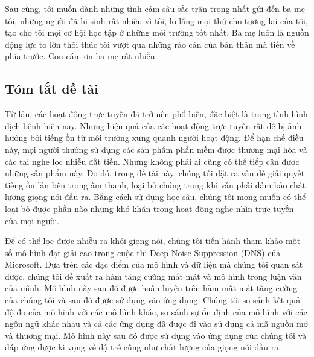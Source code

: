\documentclass[a4paper, oneside, 13pt]{book}
\begin{document}
	Sau cùng, tôi muốn dành những tình cảm sâu sắc trân trọng nhất gửi đến ba mẹ tôi, những người đã hi sinh rất nhiều vì tôi, lo lắng mọi thứ cho tương lai của tôi, tạo cho tôi mọi cơ hội học tập ở những môi trường tốt nhất. Ba mẹ luôn là nguồn động lực to lớn thôi thúc tôi vượt qua những rào cản của bản thân mà tiến về phía trước. Con cám ơn ba mẹ rất nhiều.

\setlength{\parskip}{0mm}

\newpage
\setlength{\parskip}{2.5mm}
\thispagestyle{plain}
	\begin{center}
		\section*{Tóm tắt đề tài}
	\end{center}
	
	
	Từ lâu, các hoạt động trực tuyến đã trở nên phổ biến, đặc biệt là trong tình hình dịch bệnh hiện nay. Nhưng hiệu quả của các hoạt động trực tuyến rất dễ bị ảnh hưởng bởi tiếng ồn từ môi trường xung quanh người hoạt động. Để hạn chế điều này, mọi người thường sử dụng các sản phẩm phần mềm được thương mại hóa và các tai nghe lọc nhiễu đắt tiền. Nhưng không phải ai cũng có thể tiếp cận được những sản phẩm này. Do đó, trong đề tài này, chúng tôi đặt ra vấn đề giải quyết tiếng ồn lẫn bên trong âm thanh, loại bỏ chúng trong khi vẫn phải đảm bảo chất lượng giọng nói đầu ra. Bằng cách sử dụng học sâu, chúng tôi mong muốn có thể loại bỏ được phần nào những khó khăn trong hoạt động nghe nhìn trực tuyến của mọi người.
	
	Để có thể lọc được nhiễu ra khỏi giọng nói, chúng tôi tiến hành tham khảo một số mô hình đạt giải cao trong cuộc thi Deep Noise Suppression (DNS) \cite{dns} của Microsoft. Dựa trên các đặc điểm của mô hình và dữ liệu mà chúng tôi quan sát được, chúng tôi đề xuất ra hàm tăng cường mất mát và mô hình trong luận văn của mình. Mô hình này sau đó được huấn luyện trên hàm mất mát tăng cường của chúng tôi và sau đó được sử dụng vào ứng dụng. Chúng tôi so sánh kết quả độ đo của mô hình với các mô hình khác, so sánh sự ổn định của mô hình với các ngôn ngữ khác nhau và cả các ứng dụng đã được đi vào sử dụng cả mã nguồn mở và thương mại. Mô hình này sau đó  được sử dụng vào ứng dụng của chúng tôi và đáp ứng được kì vọng về độ trễ cũng như chất lượng của giọng nói đầu ra.
	
\end{document}
